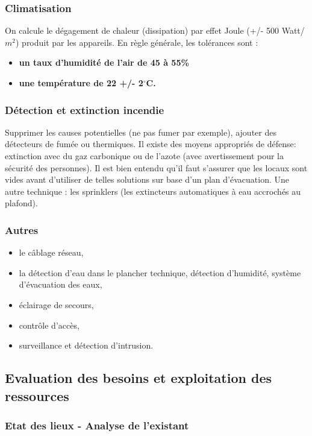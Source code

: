 \documentclass[10pt,a4paper,oneside,titlepage]{report}
\begin{document}
\subsubsection{Climatisation}

On calcule le dégagement de chaleur (dissipation) par effet Joule (+/- 500
Watt/$m^2$) produit par les appareils. En règle générale, les tolérances sont :
\begin{itemize}
\item \textbf{un taux d'humidité de l'air de 45 à 55\%}
\item \textbf{une température de 22 +/- 2$^\circ$C.}
\end{itemize}

\subsubsection{Détection et extinction incendie}

Supprimer les causes potentielles (ne pas fumer par exemple), ajouter des
détecteurs de fumée ou thermiques. Il existe des moyens appropriés de défense:
extinction avec du gaz carbonique ou de l'azote (avec avertissement pour la
sécurité des personnes). Il est bien entendu qu'il faut s'assurer que les locaux
sont vides avant d'utiliser de telles solutions sur base d'un plan d'évacuation.
Une autre technique : les sprinklers (les extincteurs automatiques à eau
accrochés au plafond).

\subsubsection{Autres}

\begin{itemize}
\item le c\^ablage réseau,
\item la détection d'eau dans le plancher technique, détection d'humidité,
système d'évacuation des eaux,
\item éclairage de secours,
\item contr\^ole d'accès,
\item surveillance et détection d'intrusion.
\end{itemize}

\subsection{Evaluation des besoins et exploitation des ressources}

\subsubsection{Etat des lieux - Analyse de l'existant}
\end{document}
